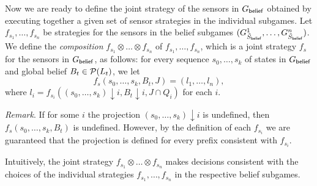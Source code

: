 Now we are ready to define the joint strategy of the sensors in $G_{\mathsf{belief}}$ obtained by executing together a given set of sensor strategies in the individual subgames. 
Let $f_{s_1},\ldots,f_{s_n}$ be strategies for the sensors in the belief subgames $(G^{1}_{\tilde{S}_{\mathsf{belief}}},\ldots,G^{n}_{\tilde{S}_{\mathsf{belief}}})$. We define the \emph{composition} $f_{s_1} \otimes\ldots\otimes f_{s_n}$ of $f_{s_1},\ldots,f_{s_n}$, which is a joint strategy $f_s$ for the sensors in $G_{\mathsf{belief}}$, as follows:
for every sequence $s_0,\ldots,s_k$ of states in $G_{\mathsf{belief}}$ and global belief $B_t \in \mathcal{P}(L_t)$, we let
\[f_s(s_0,\ldots,s_k,B_t,J) = (l_1,\ldots,l_n),\]
where $l_i = f_{s_i}((s_0,\ldots,s_k){\downarrow}i,B_t{\downarrow}i, J \cap Q_i)$ for each $i$. 

\emph{Remark}. If for some $i$ the projection $(s_0,\ldots,s_k){\downarrow}i$ is undefined, then $f_s(s_0,\ldots,s_k,B_t)$ is undefined. However, by the definition of each $f_{s_i}$ we are guaranteed that the projection is defined for every prefix consistent with $f_{s_i}$.

Intuitively, the joint strategy $f_{s_1} \otimes\ldots\otimes f_{s_n}$ makes decisions consistent with the choices of the individual strategies $f_{s_1}, \ldots, f_{s_n}$ in the respective belief subgames.


